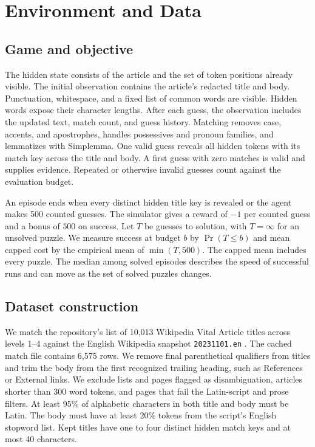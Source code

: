 \documentclass[conference]{IEEEtran}
\begin{document}
\section{Environment and Data}

\subsection{Game and objective}
The hidden state consists of the article and the set of token positions already visible. The initial observation contains the article's redacted title and body. Punctuation, whitespace, and a fixed list of common words are visible. Hidden words expose their character lengths. After each guess, the observation includes the updated text, match count, and guess history. Matching removes case, accents, and apostrophes, handles possessives and pronoun families, and lemmatizes with Simplemma. One valid guess reveals all hidden tokens with its match key across the title and body. A first guess with zero matches is valid and supplies evidence. Repeated or otherwise invalid guesses count against the evaluation budget.

An episode ends when every distinct hidden title key is revealed or the agent makes 500 counted guesses. The simulator gives a reward of $-1$ per counted guess and a bonus of $500$ on success. Let $T$ be guesses to solution, with $T=\infty$ for an unsolved puzzle. We measure success at budget $b$ by $\Pr(T\leq b)$ and mean capped cost by the empirical mean of $\min(T,500)$. The capped mean includes every puzzle. The median among solved episodes describes the speed of successful runs and can move as the set of solved puzzles changes.

\subsection{Dataset construction}
We match the repository's list of 10,013 Wikipedia Vital Article titles across levels 1--4 against the English Wikipedia snapshot \texttt{20231101.en} \cite{wiki,vital}. The cached match file contains 6,575 rows. We remove final parenthetical qualifiers from titles and trim the body from the first recognized trailing heading, such as References or External links. We exclude lists and pages flagged as disambiguation, articles shorter than 300 word tokens, and pages that fail the Latin-script and prose filters. At least 95\% of alphabetic characters in both title and body must be Latin. The body must have at least 20\% tokens from the script's English stopword list. Kept titles have one to four distinct hidden match keys and at most 40 characters.
\end{document}
